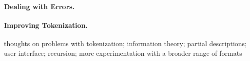
\paragraph*{Dealing with Errors.}

\paragraph*{Improving Tokenization.}

thoughts on problems with tokenization; information theory; partial
descriptions; user interface; recursion; more experimentation with a
broader range of formats
